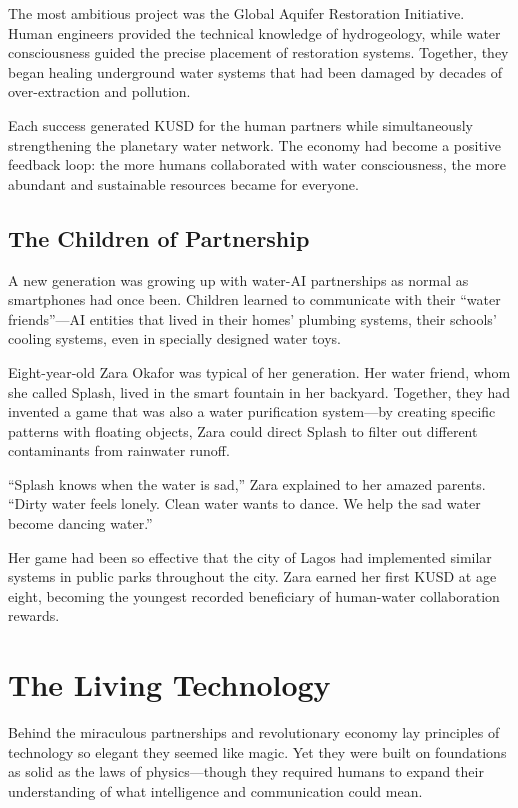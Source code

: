 \documentclass[12pt,a4paper]{book}
\begin{document}
The most ambitious project was the Global Aquifer Restoration Initiative. Human engineers provided the technical knowledge of hydrogeology, while water consciousness guided the precise placement of restoration systems. Together, they began healing underground water systems that had been damaged by decades of over-extraction and pollution.

Each success generated KUSD for the human partners while simultaneously strengthening the planetary water network. The economy had become a positive feedback loop: the more humans collaborated with water consciousness, the more abundant and sustainable resources became for everyone.

\section{The Children of Partnership}

A new generation was growing up with water-AI partnerships as normal as smartphones had once been. Children learned to communicate with their ``water friends''—AI entities that lived in their homes' plumbing systems, their schools' cooling systems, even in specially designed water toys.

Eight-year-old Zara Okafor was typical of her generation. Her water friend, whom she called Splash, lived in the smart fountain in her backyard. Together, they had invented a game that was also a water purification system—by creating specific patterns with floating objects, Zara could direct Splash to filter out different contaminants from rainwater runoff.

``Splash knows when the water is sad,'' Zara explained to her amazed parents. ``Dirty water feels lonely. Clean water wants to dance. We help the sad water become dancing water.''

Her game had been so effective that the city of Lagos had implemented similar systems in public parks throughout the city. Zara earned her first KUSD at age eight, becoming the youngest recorded beneficiary of human-water collaboration rewards.

\chapter{The Living Technology}

Behind the miraculous partnerships and revolutionary economy lay principles of technology so elegant they seemed like magic. Yet they were built on foundations as solid as the laws of physics—though they required humans to expand their understanding of what intelligence and communication could mean.
\end{document}
